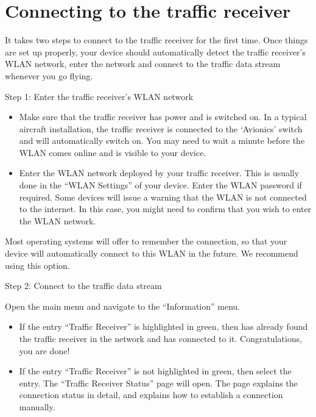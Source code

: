 \documentclass[letterpaper,10pt,english]{sphinxmanual}
\begin{document}
\section{Connecting to the traffic receiver}
\label{\detokenize{02-steps/traffic:connecting-to-the-traffic-receiver}}
\sphinxAtStartPar
It takes two steps to connect  to the traffic
receiver for the first time. Once things are set up properly, your device should
automatically detect the traffic receiver’s WLAN network, enter the network and
connect to the traffic data stream whenever you go flying.

\sphinxAtStartPar
Step 1: Enter the traffic receiver’s WLAN network
\begin{itemize}
\item {} 
\sphinxAtStartPar
Make sure that the traffic receiver has power and is switched on. In a typical
aircraft installation, the traffic receiver is connected to the ‘Avionics’
switch and will automatically switch on. You may need to wait a minute before
the WLAN comes online and is visible to your device.

\item {} 
\sphinxAtStartPar
Enter the WLAN network deployed by your traffic receiver. This is usually done
in the “WLAN Settings” of your device. Enter the WLAN password if
required. Some devices will issue a warning that the WLAN is not connected to
the internet. In this case, you might need to confirm that you wish to enter
the WLAN network.

\end{itemize}

\sphinxAtStartPar
Most operating systems will offer to remember the connection, so that your
device will automatically connect to this WLAN in the future. We recommend using
this option.

\sphinxAtStartPar
Step 2: Connect to the traffic data stream

\sphinxAtStartPar
Open the main menu and navigate to the “Information” menu.
\begin{itemize}
\item {} 
\sphinxAtStartPar
If the entry “Traffic Receiver” is highlighted in green, then  has already found the traffic receiver in the network and has
connected to it. Congratulations, you are done!

\item {} 
\sphinxAtStartPar
If the entry “Traffic Receiver” is not highlighted in green, then select the
entry. The “Traffic Receiver Status” page will open. The page explains the
connection status in detail, and explains how to establish a connection
manually.

\end{itemize}
\end{document}
